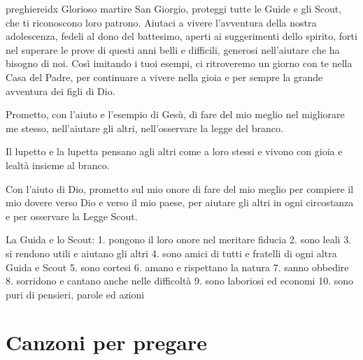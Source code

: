 \documentclass[a4paper,12pt, twoside]{article}
\begin{document}
\begin{songs}{preghiereidx}
\beginverse
Glorioso martire San Giorgio,
proteggi tutte le Guide e gli Scout,
che ti riconoscono loro patrono.
Aiutaci a vivere l’avventura della nostra adolescenza,
fedeli al dono del battesimo,
aperti ai suggerimenti dello spirito,
forti nel superare le prove di questi anni belli e difficili,
generosi nell’aiutare che ha bisogno di noi.
Così imitando i tuoi esempi,
ci ritroveremo un giorno con te nella Casa del Padre,
per continuare a vivere nella gioia e per sempre
la grande avventura dei figli di Dio.
\endverse
\endsong

\nextcol

\beginverse
Prometto, con l’aiuto e l’esempio di Gesù, di fare del mio meglio
nel migliorare me stesso,
nell’aiutare gli altri,
nell’osservare la legge del branco.
\endverse
\endsong



\beginverse
Il lupetto e la lupetta pensano agli altri come a loro stessi
e vivono con gioia e lealtà insieme al branco.
\endverse
\endsong

\begin{intersong}
\bigskip
\end{intersong}


\beginverse
Con l’aiuto di Dio, prometto sul mio onore di fare del
mio meglio per compiere il mio dovere verso Dio e verso
il mio paese, per aiutare gli altri in ogni circostanza e per
osservare la Legge Scout.
\endverse
\endsong

\bigskip

\beginverse
La Guida e lo Scout:
1. pongono il loro onore nel meritare fiducia
2. sono leali
3. si rendono utili e aiutano gli altri
4. sono amici di tutti e fratelli di ogni altra Guida e Scout
5. sono cortesi
6. amano e rispettano la natura
7. sanno obbedire
8. sorridono e cantano anche nelle difficoltà
9. sono laboriosi ed economi
10. sono puri di pensieri, parole ed azioni
\endverse
\endsong

\end{songs}




\section*{Canzoni per pregare}
\end{document}
